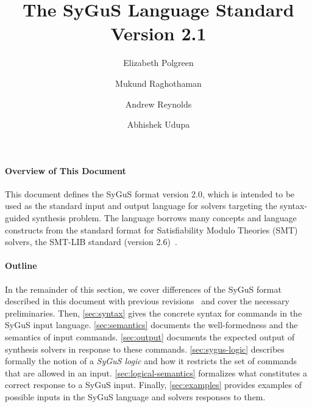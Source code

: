 \documentclass[english,a4paper,10pt]{article}
\begin{document}
\title{The SyGuS Language Standard Version 2.1}

\author{Elizabeth Polgreen \and Mukund Raghothaman \and Andrew Reynolds \and Abhishek Udupa}

\maketitle







\paragraph{Overview of This Document}
This document defines the SyGuS format version 2.0,
which is intended to be used as the standard input and output language
for solvers targeting the syntax-guided synthesis problem.
The language borrows many concepts and language constructs
from the standard format for Satisfiability Modulo Theories (SMT)
solvers, the SMT-LIB standard (version 2.6)~\cite{BarFT-RR-17}.

\begin{comment}
We would like to thank the following people for their helpful
suggestions and feedback regarding this document (listed alphabetically):
Haniel Barbosa,
Andres N\"otzli,
Saswat Padhi,
Sanjit A.~Seshia,
Rishabh Singh,
Cesare Tinelli.
\end{comment}

\paragraph{Outline}
In the remainder of this section, we cover differences of
the SyGuS format described in this document with previous revisions~\cite{sygusFormat,sygusSyntax2015,sygusSyntax2016}
and cover the necessary preliminaries.
Then,
\cref{sec:syntax}
gives the concrete syntax for commands in the SyGuS input language.
\cref{sec:semantics}
documents the well-formedness and the semantics of input commands.
\cref{sec:output}
documents the expected output of synthesis solvers in response to these commands.
\cref{sec:sygus-logic}
describes formally the notion of a \emph{SyGuS logic} and how it restricts
the set of commands that are allowed in an input.
\cref{sec:logical-semantics}
formalizes what constitutes a correct response to a SyGuS input.
Finally, \cref{sec:examples}
provides examples of possible inputs in the SyGuS language
and solvers responses to them.
\end{document}

